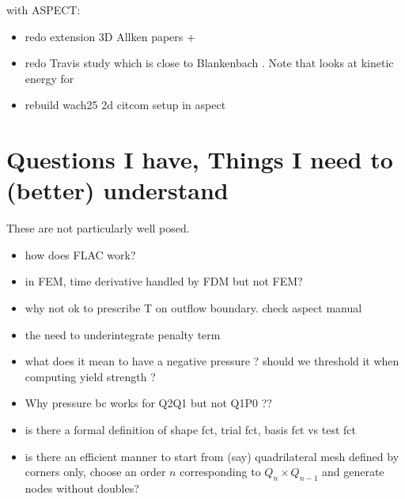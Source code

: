 \documentclass[a4paper]{article}
\begin{document}
with ASPECT:

\begin{itemize}
\item redo extension 3D Allken papers + \cite{poay84,katl95} 
\item redo Travis study \cite{trab90} which is close to Blankenbach \cite{blbc89}. 
Note that \cite{maie12} looks at kinetic energy for \cite{trab90}
\item rebuild wach25 2d citcom setup in aspect 
\end{itemize}


\newpage
\section{Questions I have, Things I need to (better) understand}

These are not particularly well posed. 

\begin{itemize}
\item how does FLAC work?
\item in FEM, time derivative handled by FDM but not FEM?
\item why not ok to prescribe T on outflow boundary. check aspect manual
\item the need to underintegrate penalty term
\item what does it mean to have a negative pressure ? should we threshold it when computing yield strength ? 
\item Why pressure bc works for Q2Q1 but not Q1P0 ??
\item is there a formal definition of shape fct, trial fct, basis fct vs test fct 
\item is there an efficient manner to start from (say) quadrilateral mesh defined by corners only, choose an 
order $n$ corresponding to $Q_n \times Q_{n-1}$ and generate nodes without doubles?
\end{itemize}
\end{document}
